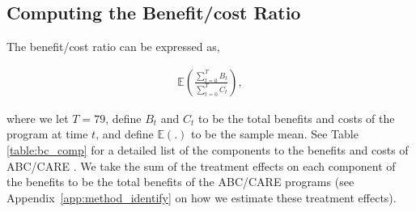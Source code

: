 

\subsection{Computing the Benefit/cost Ratio}
\label{app:method_cbratio}

\noindent The benefit/cost ratio can be expressed as,

\begin{align}
\mathbb{E} \left( \frac{ \sum_{t=0}^T B_t}{\sum_{t=0}^T C_t} \right),
\end{align}

\noindent where we let $T = 79$, define $B_t$ and $C_t$ to be the total benefits and costs of the
program at time $t$, and define $\mathbb{E}(.)$ to be the sample mean. See Table \ref{table:bc_comp} for a detailed list of the components
to the benefits and costs of ABC/CARE . We take the sum of the treatment effects on each component
of the benefits to be the total benefits of the ABC/CARE programs (see Appendix~\ref{app:method_identify} on how we estimate these treatment effects). \\

